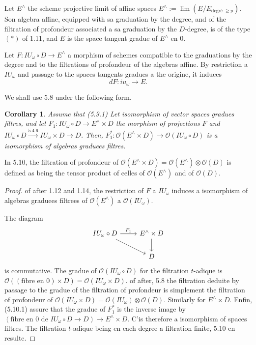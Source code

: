 \documentclass[11pt,a4paper]{article}
\theoremstyle{plain}
\newtheorem{corollary}[theorem]{Corollary}
\theoremstyle{definition}
\begin{document}
Let $E^{\wedge}$ the scheme projective limit of affine spaces $E^{\wedge} := \lim(E/E_{\text{degr\'e } \geq p})$. Son algebra affine, equipped with sa graduation by the degree, and of the filtration of profondeur associated a sa graduation by the $D$-degree, is of the type $(\ast)$ of 1.11, and $E$ is the space tangent gradue of $E^{\wedge}$ en $0$.

Let $F: IU_\omega \circ D \to E^{\wedge}$ a morphism of schemes compatible to the graduations by the degree and to the filtrations of profondeur of the algebras affine. By restriction a $IU_\omega$ and passage to the spaces tangents gradues a the origine, it induces
\begin{equation}\label{eq:5.9.1}
dF: iu_\omega \to E.
\end{equation}

We shall use 5.8 under the following form.

\begin{corollary}\label{cor:5.10}
Assume that (5.9.1) Let isomorphism of vector spaces gradues filtres, and let $F_1: IU_\omega \circ D \to E^{\wedge} \times D$ the morphism of projections $F$ and $IU_\omega \circ D \xrightarrow{5.4.6} IU_\omega \times D \to D$. Then, $F_1^*: \mathcal{O}(E^{\wedge} \times D) \to \mathcal{O}(IU_\omega \circ D)$ is a isomorphism of algebras graduees filtres.
\end{corollary}

In 5.10, the filtration of profondeur of $\mathcal{O}(E^{\wedge} \times D) = \mathcal{O}(E^{\wedge}) \otimes \mathcal{O}(D)$ is defined as being the tensor product of celles of $\mathcal{O}(E^{\wedge})$ and of $\mathcal{O}(D)$.

\begin{proof}
of after 1.12 and 1.14, the restriction of $F$ a $IU_\omega$ induces a isomorphism of algebras graduees filtrees of $\mathcal{O}(E^{\wedge})$ a $\mathcal{O}(IU_\omega)$.

The diagram
\begin{equation}\label{eq:5.10.1}
\begin{tikzcd}
IU_\omega \circ D \arrow{r}{F_1} \arrow{dr} & E^{\wedge} \times D \arrow{d} \\
& D
\end{tikzcd}
\end{equation}
is commutative. The gradue of $\mathcal{O}(IU_\omega \circ D)$ for the filtration $t$-adique is $\mathcal{O}((\text{fibre en } 0) \times D) = \mathcal{O}(IU_\omega \times D)$. of after, 5.8 the filtration deduite by passage to the gradue of the filtration of profondeur is simplement the filtration of profondeur of $\mathcal{O}(IU_\omega \times D) = \mathcal{O}(IU_\omega) \otimes \mathcal{O}(D)$. Similarly for $E^{\wedge} \times D$. Enfin, (5.10.1) assure that the gradue of $F_1^*$ is the inverse image by $(\text{fibre en } 0 \text{ de } IU_\omega \circ D \to D) \to E^{\wedge} \times D$. C'is therefore a isomorphism of spaces filtres. The filtration $t$-adique being en each degree a filtration finite, 5.10 en resulte.
\end{proof}
\end{document}
